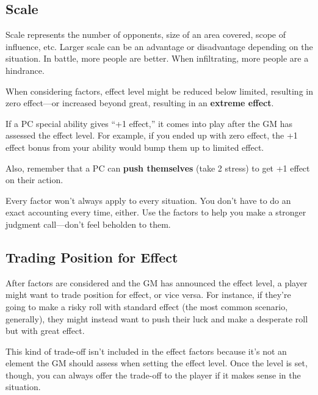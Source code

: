 \subsection{Scale}

Scale represents the number of opponents, size of an area covered, scope of influence, etc. Larger scale can be an advantage or disadvantage depending on the situation. In battle, more people are better. When infiltrating, more people are a hindrance.

When considering factors, effect level might be reduced below limited, resulting in zero effect—or increased beyond great, resulting in an \textbf{extreme effect}.

If a PC special ability gives ``+1 effect,'' it comes into play after the GM has assessed the effect level. For example, if you ended up with zero effect, the +1 effect bonus from your  ability would bump them up to limited effect.

Also, remember that a PC can \textbf{push themselves} (take 2 stress) to get +1 effect on their action.

Every factor won’t always apply to every situation. You don’t have to do an exact accounting every time, either. Use the factors to help you make a stronger judgment call---don’t feel beholden to them.

\subsection{Trading Position for Effect}

After factors are considered and the GM has announced the effect level, a player might want to trade position for effect, or vice versa. For instance, if they’re going to make a risky roll with standard effect (the most common scenario, generally), they might instead want to push their luck and make a desperate roll but with great effect.

This kind of trade-off isn’t included in the effect factors because it’s not an element the GM should assess when setting the effect level. Once the level is set, though, you can always offer the trade-off to the player if it makes sense in the situation.


